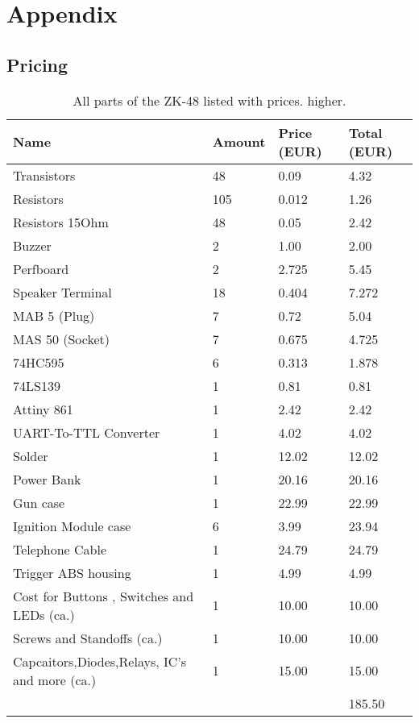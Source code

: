 \section{Appendix}
\subsection{Pricing}

\begin{table}[!ht]
    \centering
    \begin{tabular}{|l|l|l|l|}
    \hline
        Name & Amount & Price (EUR) & Total (EUR)  \\ \hline \hline
        Transistors & 48 & 0.09 & 4.32 \\ \hline
        Resistors & 105 & 0.012 & 1.26  \\ \hline
        Resistors 15Ohm & 48 & 0.05 & 2.42 \\ \hline
        Buzzer & 2 & 1.00 & 2.00  \\ \hline
        Perfboard & 2 & 2.725 & 5.45 \\ \hline
        Speaker Terminal & 18 & 0.404 & 7.272\\ \hline
        MAB 5 (Plug) & 7 & 0.72 & 5.04  \\ \hline
        MAS 50 (Socket) & 7 & 0.675 & 4.725  \\ \hline
        74HC595 & 6 & 0.313 & 1.878  \\ \hline
        74LS139 & 1 & 0.81 & 0.81  \\ \hline
        Attiny 861 & 1 & 2.42 & 2.42\\ \hline
        UART-To-TTL Converter & 1 & 4.02 & 4.02  \\ \hline
        Solder & 1 & 12.02 & 12.02 \\ \hline
        Power Bank & 1 & 20.16 & 20.16  \\ \hline
        Gun case & 1 & 22.99 & 22.99 \\ \hline
        Ignition Module case & 6 & 3.99 & 23.94  \\ \hline
        Telephone Cable & 1 & 24.79 & 24.79  \\ \hline
        Trigger ABS housing & 1 & 4.99 & 4.99  \\ \hline
        Cost for Buttons , Switches and LEDs (ca.) & 1 & 10.00 & 10.00 \\ \hline
        Screws and Standoffs (ca.) & 1 & 10.00 & 10.00 \\ \hline
        Capcaitors,Diodes,Relays, IC's and more (ca.) & 1 & 15.00 & 15.00  \\ \hline\hline
        ~ & ~ & ~ & 185.50
  \\ \hline
    \end{tabular}
    \caption{All parts of the ZK-48 listed with prices. higher.}
    \label{tab:cost}
\end{table}

